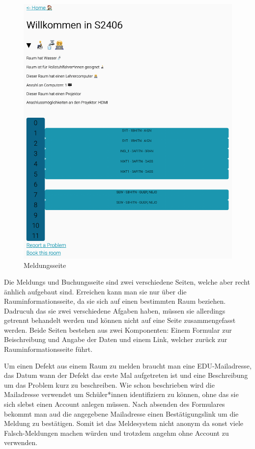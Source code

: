 \begin{figure}[H]
    \centering
    \includegraphics[width=120mm]{media/WebComponents/Rauminformationsseite_light.png}
    \caption{Meldungsseite}
\end{figure}


Die Meldungs und Buchungsseite sind zwei verschiedene Seiten, welche aber recht änhlich aufgebaut sind. Erreichen kann man sie nur über die Rauminformationsseite, da sie sich auf einen bestimmten Raum beziehen. Dadrucuh das sie zwei verschiedene Afgaben haben, müssen sie allerdings getrennt behandelt werden und können nicht auf eine Seite zusammengefasst werden. Beide Seiten bestehen aus zwei Komponenten: Einem Formular zur Beischreibung und Angabe der Daten und einem Link, welcher zurück zur Rauminformationsseite führt.
  

Um einen Defekt aus einem Raum zu melden braucht man eine EDU-Mailadresse, das Datum wann der Defekt das erste Mal aufgetreten ist und eine Beschreibung um das Problem kurz zu beschreiben. Wie schon beschrieben wird die Mailadresse verwendet um Schüler*innen identifiziern zu können, ohne das sie sich slebst einen Account anlegen müssen. Nach absenden des Formulares bekommt man aud die angegebene Mailadresse einen Bestätigungslink um die Meldung zu bestätigen. Somit ist das Meldesystem nicht anonym da sonst viele Falsch-Meldungen machen würden und trotzdem angehm ohne Account zu verwenden. 

